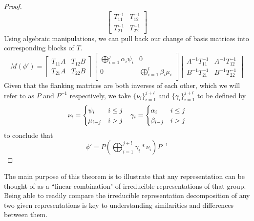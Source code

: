 \begin{proof}
\begin{equation}
\begin{bmatrix}
					T_{11}^{-1} & T_{12}^{-1} \\
					T_{21}^{-1} & T_{22}^{-1}
				\end{bmatrix}
\end{equation}
Using algebraic manipulations, we can pull back our change of basis matrices into corresponding blocks of $T$.
\begin{equation}
	M(\phi') =  \begin{bmatrix}
					T_{11}A & T_{12}B \\
					T_{21}A & T_{22}B
				\end{bmatrix}
				\begin{bmatrix}
					\bigoplus_{i=1}^j \alpha_i\psi_i & 0\\
					0 &  \bigoplus_{i=1}^{l} \beta_i\mu_i \\
				\end{bmatrix}
				\begin{bmatrix}
					A^{-1}T_{11}^{-1} & A^{-1}T_{12}^{-1} \\
					B^{-1}T_{21}^{-1} & B^{-1}T_{22}^{-1}
				\end{bmatrix}
\end{equation}
Given that the flanking matrices are both inverses of each other, which we will refer to as $P$ and $P^{-1}$ respectively, we take $\{\nu_i\}_{i=1}^{j+l}$ and  $\{\gamma_i\}_{i=1}^{j+l}$ to be defined by 
$$\begin{array}{c c}
	\nu_i = \begin{cases}
		\psi_i & i \leq j\\
		\mu_{i-j} & i > j
	\end{cases}
&
	\gamma_i = \begin{cases}
		\alpha_i & i \leq j\\
		\beta_{i-j} & i > j
	\end{cases}
\end{array}$$
to conclude that
\begin{equation}
	\phi' = P\left(\bigoplus_{i=1}^{j+l} \gamma_i*\nu_i\right)P^{-1}
\end{equation} \end{proof}

\begin{remark}
	The main purpose of this theorem is to illustrate that any representation can be thought of as a ``linear combination" of irreducible representations of that group. Being able to readily compare the irreducible representation decomposition of any two given representations is key to understanding similarities and differences between them.
\end{remark}

